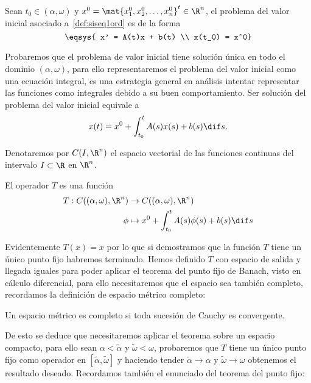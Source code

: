 \documentclass[../main.tex]{subfiles}
\begin{document}
\begin{definition}
	Sean \(t_0 \in (\alpha, \omega)\) y 
	\(x^0 = \mat{x^0_1, x^0_2, \dots, x^0_n}^t \in \R^n\), el problema del valor
	inicial asociado a~\ref{def:siseq1ord} es de la forma
	\[\eqsys{
		x' = A(t)x + b(t) \\
		x(t_0) = x^0}\]
\end{definition}

Probaremos que el problema de valor inicial tiene solución única en todo el
dominio \((\alpha, \omega)\), para ello representaremos el problema del valor 
inicial como una ecuación integral, es una estrategia general en análisis 
intentar representar las funciones como integrales debido a su buen
comportamiento. Ser solución del problema del valor inicial equivale a
\[x(t) = x^0 + \int_{t_0}^t A(s)x(s) + b(s) \dif s.\]

Denotaremos por \(C(I, \R^n)\) el espacio vectorial de las funciones continuas
del intervalo \(I \subset \R\) en \(\R^n\).

\begin{definition}
	El operador \(T\) es una función
	\begin{align*}
		T : C((\alpha, \omega), \R^n) &\to C((\alpha, \omega), \R^n) \\
		\phi  &\mapsto x^0 + \int_{t_0}^t A(s) \phi(s) + b(s) \dif s
	\end{align*}
\end{definition}

Evidentemente \(T(x) = x\) por lo que si demostramos que la función \(T\) tiene 
un único punto fijo habremos terminado. Hemos definido \(T\) con espacio de
salida y llegada iguales para poder aplicar el teorema del punto fijo de Banach,
visto en cálculo diferencial, para ello necesitaremos que el espacio sea también 
completo, recordamos la definición de espacio métrico completo: 

\begin{definition}
	Un espacio métrico es completo si toda sucesión de Cauchy es convergente.
\end{definition}

De esto se deduce que necesitaremos aplicar el teorema sobre un espacio
compacto, para ello sean
\(\alpha < \tilde{\alpha}\) y \(\tilde{\omega} < \omega\), probaremos que 
\(T\) tiene un único punto fijo como operador en 
\([\tilde{\alpha}, \tilde{\omega}]\) y haciendo tender 
\(\tilde{\alpha} \to \alpha\) y \(\tilde{\omega} \to \omega\) obtenemos el
resultado deseado. Recordamos también el enunciado del teorema del punto fijo:
\end{document}
